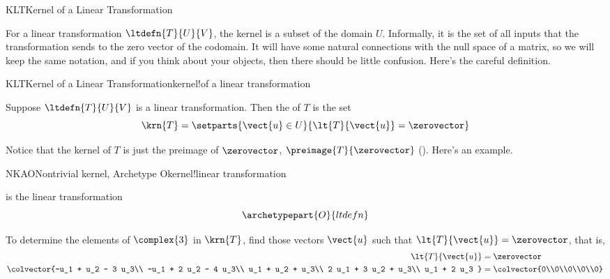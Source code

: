 \begin{subsect}{KLT}{Kernel of a Linear Transformation}
%
\begin{para}For a linear transformation $\ltdefn{T}{U}{V}$, the kernel is a subset of the domain $U$.  Informally, it is the set of all inputs that the transformation sends to the zero vector of the codomain.  It will have some natural connections with the null space of a matrix, so we will keep the same notation, and if you think about your objects, then there should be little confusion.  Here's the careful definition.\end{para}
%
\begin{definition}{KLT}{Kernel of a Linear Transformation}{kernel!of a linear transformation}
\begin{para}Suppose $\ltdefn{T}{U}{V}$ is a linear transformation.  Then the  of $T$ is the set
%
\begin{equation*}
\krn{T}=\setparts{\vect{u}\in U}{\lt{T}{\vect{u}}=\zerovector}
\end{equation*}
\end{para}
%
\end{definition}
%
\begin{para}Notice that the kernel of $T$ is just the preimage of $\zerovector$, $\preimage{T}{\zerovector}$ ().  Here's an example.\end{para}
%
\begin{example}{NKAO}{Nontrivial kernel, Archetype O}{kernel!linear transformation}
\begin{para} is the linear transformation
%
\begin{equation*}
\archetypepart{O}{ltdefn}\end{equation*}
\end{para}
%
\begin{para}To determine the elements of $\complex{3}$ in $\krn{T}$, find those vectors $\vect{u}$ such that $\lt{T}{\vect{u}}=\zerovector$, that is,
%
\begin{align*}
\lt{T}{\vect{u}}&=\zerovector\\
\colvector{-u_1 + u_2 - 3 u_3\\
-u_1 + 2 u_2 - 4 u_3\\
u_1 + u_2 + u_3\\
2 u_1 + 3 u_2 + u_3\\
u_1 + 2 u_3
}
&=
\colvector{0\\0\\0\\0\\0}

\end{align*}
\end{para}
\end{example}
\end{subsect}
